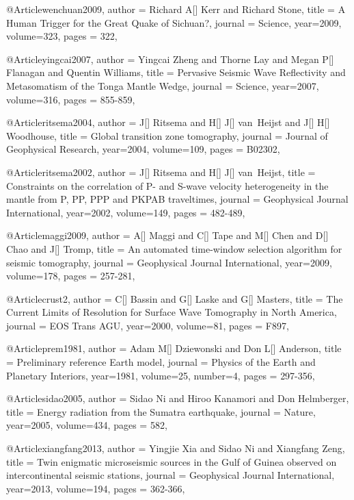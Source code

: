 @Article{wenchuan2009,
  author =	 {Richard A[] Kerr and Richard Stone},
  title =	 {A Human Trigger for the Great Quake of Sichuan?},
  journal =	 {Science},
  year=2009,
  volume=323,
  pages =	 {322},
}

@Article{yingcai2007,
  author =	 {Yingcai Zheng and Thorne Lay and Megan P[] Flanagan and Quentin Williams},
  title =	 {Pervasive Seismic Wave Reflectivity and Metasomatism of the Tonga Mantle Wedge},
  journal =	 {Science},
  year=2007,
  volume=316,
  pages =	 {855-859},
}

@Article{ritsema2004,
  author =	 {J[] Ritsema and H[] J[] van~Heijst and J[] H[] Woodhouse},
  title =	 {Global transition zone tomography},
  journal =	 {Journal of Geophysical Research},
  year=2004,
  volume=109,
  pages =	 {B02302},
}

@Article{ritsema2002,
  author =	 {J[] Ritsema and H[] J[] van~Heijst},
  title =	 {Constraints on the correlation of P- and S-wave velocity heterogeneity in the mantle from P, PP, PPP and PKPAB traveltimes},
  journal =	 {Geophysical Journal International},
  year=2002,
  volume=149,
  pages =	 {482-489},
}

@Article{maggi2009,
  author =	 {A[] Maggi and C[] Tape and M[] Chen and D[] Chao and J[] Tromp},
  title =	 {An automated time-window selection algorithm for seismic tomography},
  journal =	 {Geophysical Journal International},
  year=2009,
  volume=178,
  pages =	 {257-281},
}




@Article{crust2,
  author =	 {C[] Bassin and G[] Laske and G[] Masters},
  title =	 {The Current Limits of Resolution for Surface Wave Tomography in North America},
  journal =	 {EOS Trans AGU},
  year=2000,
  volume=81,
  pages =	 {F897},
}

@Article{prem1981,
  author =	 {Adam M[] Dziewonski and Don L[] Anderson},
  title =	 {Preliminary reference Earth model},
  journal =	 {Physics of the Earth and Planetary Interiors},
  year=1981,
  volume=25,
  number=4,
  pages =	 {297-356},
}



@Article{sidao2005,
  author =	 {Sidao Ni and Hiroo Kanamori and Don Helmberger},
  title =	 {Energy radiation from the Sumatra earthquake},
  journal =	 {Nature},
  year=2005,
  volume=434,
  pages =	 {582},
}

@Article{xiangfang2013,
  author =	 {Yingjie Xia and Sidao Ni and Xiangfang Zeng},
  title =	 {Twin enigmatic microseismic sources in the Gulf of Guinea observed on intercontinental seismic stations},
  journal =	 {Geophysical Journal International},
  year=2013,
  volume=194,
  pages =	 {362-366},
}

